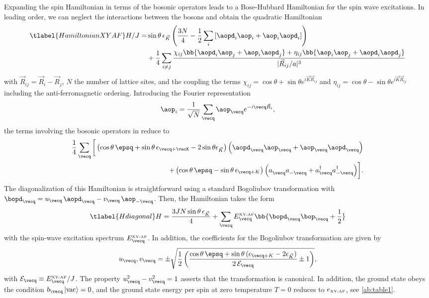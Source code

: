 Expanding the spin Hamiltonian in terms of the bosonic operators leads to a Bose-Hubbard Hamiltonian for the spin wave excitations.
In leading order, we can neglect the interactions between the bosons and obtain the quadratic Hamiltonian
%
\begin{align} \tlabel{HamiltonianXYAF}
H/J = &\sin \theta \, \epsilon_{\vec K} \left(\frac{3 N}{4} - \frac{1}{2}\sum_i\left[\aopd_{i}\aop_i+ \aop_i \aopd_{i}\right]\right) \\
           &+  \frac{1}{4} \sum_{i\ne j} \frac{
    \chi_{i j} \bb{ \aopd_{i} \aop_{j}  + \aop_{i} \aopd_{j} }
  + \eta_{i j} \bb{ \aop_{i} \aop_{j}  + \aopd_{i} \aopd_{j} }
}{|{\vec R}_{ij}/a|^3}
\end{align}
with  ${\vec R}_{ij}={\vec R}_i - {\vec R}_j$,  $N$ the number of lattice sites, and the coupling the terms
$\chi_{i j}=\cos\theta+\sin\theta e^{i {\vec K} {\vec R}_{ij}}$ and $\eta_{i j}=\cos\theta-\sin\theta e^{i {\vec K} {\vec R}_{ij}}$ including the
 anti-ferro\-magnetic ordering.
Introducing the  Fourier representation
\begin{align}
    \aop_i = \frac{1}{\sqrt{N}} \sum_{\vecq} \aop_{\vecq}e^{-i {\vecq} {\vec R}_i},
\end{align}
the terms involving the bosonic operators in  reduce to
%
\begin{align}
\frac{1}{4} \sum_{\vecq} \bigg[
\left( \cos\theta \, \epsq +\sin\theta \, \epsilon_{\vecq+\vecK} - 2 \sin \theta \epsilon_{\vec K}\right)\Big(\aopd_{\vecq} \aop_{\vecq}  + \aop_{\vecq} \aopd_{\vecq}\Big) \\
+\left( \cos\theta \, \epsq-\sin\theta \, \epsilon_{\vecq+K} \right)\Big(a^{\phantom\dag}_{\vecq} a^{\phantom\dag}_{-\vecq}
+ a^{\dag}_{\vecq} a^{\dag}_{-{\vecq}} \Big) \bigg].
\end{align}
%
The diagonalization of this Hamiltonian is straightforward using a standard Bogoliubov transformation
with $\bopd_{\vecq} = u_{\vecq}\, \aopd_{\vecq} - v_{\vecq}\, \aop_{-\vecq}$.
Then, the Hamiltonian takes the form
%
\begin{align} \tlabel{Hdiagonal}
H = \frac{3J N \sin \theta\, \epsilon_{\vec K}}{4}  + \sum_{\vecq} E^{\mbox{\tiny XY-AF}}_{\vecq} \bb{\bopd_{\vecq}\bop_{\vecq} + \frac{1}{2}}
\end{align}
%
with the spin-wave excitation spectrum $E^{\mbox{\tiny XY-AF}}_{\vecq}$. In addition, the coefficients  for the Bogoliubov transformation
are given by
%
\begin{align}
u_{\vecq} , v_{\vecq} = \pm\sqrt{\frac{1}{2} \left( \frac{\cos\theta \, \epsq +\sin\theta \, (\epsilon_{\vecq+K} - 2 \epsilon_{\vec K})}{2\, \mathcal{E}_{\vecq}}\pm 1\right)},
\end{align}
%
with $\mathcal{E}_{\vecq} \equiv E^{\mbox{\tiny XY-AF}}_{\vecq} / J $.
The property $u^2_{\vecq}-v^2_{\vecq}=1$ asserts that the transformation is canonical.
In addition, the ground state obeys the condition $b_{\vecq} \left|\text{vac}\right\rangle = 0$, and the ground state energy per spin at zero temperature $T=0$
reduces to $e_{\mbox{\tiny XY-AF}}$, see \cref{ab:table1}.

